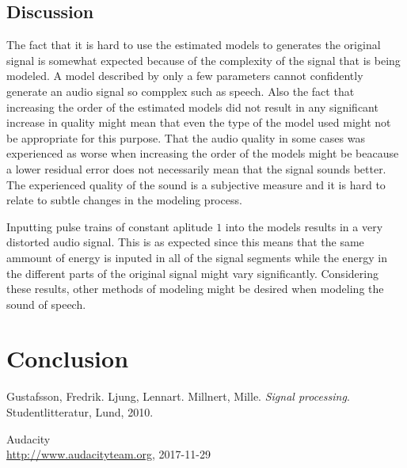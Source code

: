 \documentclass{IEEEtran}
\begin{document}
\subsection{Discussion}
The fact that it is hard to use the estimated models to generates the
original signal is somewhat expected because of the complexity of the
signal that is being modeled. A model described by only a few parameters
cannot confidently generate an audio signal so compplex such as speech.
Also the fact that increasing the order of the estimated models did not
result in any significant increase in quality might mean that even the
type of the model used might not be appropriate for this purpose. That
the audio quality in some cases was experienced as worse when increasing
the order of the models might be beacause a lower residual error does
not necessarily mean that the signal sounds better. The experienced
quality of the sound is a subjective measure and it is hard to relate
to subtle changes in the modeling process.

Inputting pulse trains of constant aplitude $1$ into the models results
in a very distorted audio signal. This is as expected since this means
that the same ammount of energy is inputed in all of the signal segments
while the energy in the different parts of the original signal might vary
significantly. Considering these results, other methods of modeling might
be desired when modeling the sound of speech.

\section{Conclusion}

\newpage
\begin{thebibliography}{9}

  Gustafsson, Fredrik. Ljung, Lennart. Millnert, Mille.
  \textit{Signal processing}.
  Studentlitteratur, Lund,
  2010.

  Audacity \\
  \url{http://www.audacityteam.org},
  2017-11-29

\end{thebibliography}
\end{document}
